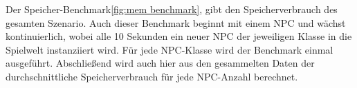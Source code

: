 Der Speicher-Benchmark\ref{fig:mem benchmark}, gibt den Speicherverbrauch des gesamten Szenario. Auch dieser Benchmark beginnt mit einem NPC und wächst kontinuierlich, wobei alle 10 Sekunden ein neuer NPC der jeweiligen Klasse in die Spielwelt instanziiert wird. Für jede NPC-Klasse wird der Benchmark einmal ausgeführt. Abschlie\ss{}end wird auch hier aus den gesammelten Daten der durchschnittliche Speicherverbrauch für jede NPC-Anzahl berechnet.
